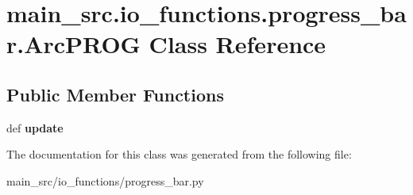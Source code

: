 \hypertarget{classmain__src_1_1io__functions_1_1progress__bar_1_1ArcPROG}{\section{main\-\_\-src.\-io\-\_\-functions.\-progress\-\_\-bar.\-Arc\-P\-R\-O\-G Class Reference}
\label{classmain__src_1_1io__functions_1_1progress__bar_1_1ArcPROG}
}
\subsection*{Public Member Functions}
\begin{DoxyCompactItemize}
\item 
\hypertarget{classmain__src_1_1io__functions_1_1progress__bar_1_1ArcPROG_a015f40bb6be173c916af00fd644a4b5b}{def {\bfseries update}}\label{classmain__src_1_1io__functions_1_1progress__bar_1_1ArcPROG_a015f40bb6be173c916af00fd644a4b5b}

\end{DoxyCompactItemize}


The documentation for this class was generated from the following file\-:\begin{DoxyCompactItemize}
\item 
main\-\_\-src/io\-\_\-functions/progress\-\_\-bar.\-py\end{DoxyCompactItemize}
